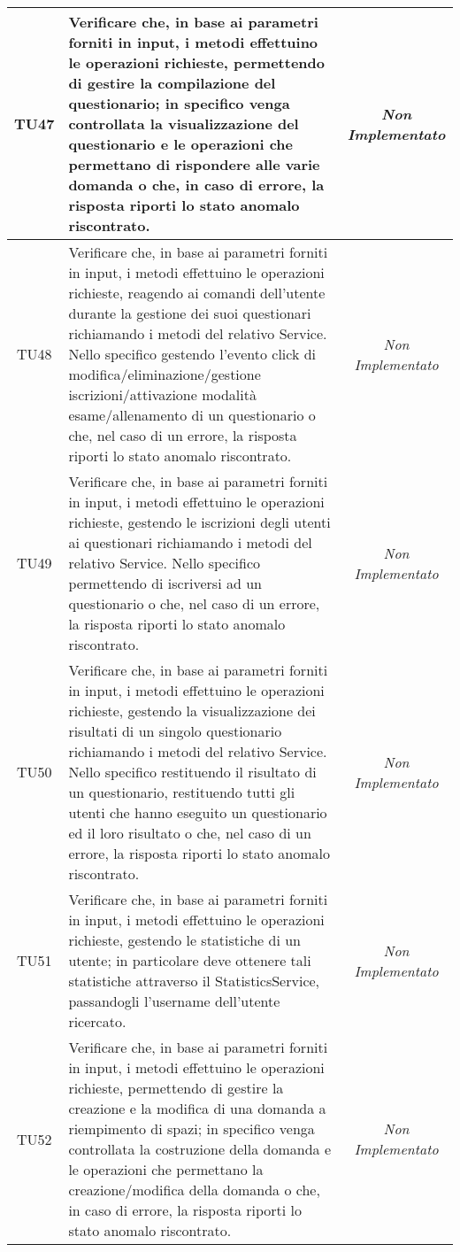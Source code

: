 \begin{longtable}{|c|>{}m{10cm}|c|}
\hypertarget{TU47}{TU47} & Verificare che, in base ai parametri forniti in input, i metodi effettuino le operazioni richieste, permettendo di gestire la compilazione del questionario; in specifico venga controllata la visualizzazione del questionario e le operazioni che permettano di rispondere alle varie domanda o che, in caso di errore, la risposta riporti lo stato anomalo riscontrato. & \textit{Non Implementato}\\ \hline
\hypertarget{TU48}{TU48} & Verificare che, in base ai parametri forniti in input, i metodi effettuino le operazioni richieste, reagendo ai comandi dell'utente durante la gestione dei suoi questionari richiamando i metodi del relativo Service. Nello specifico gestendo l'evento click di modifica/eliminazione/gestione iscrizioni/attivazione modalità esame/allenamento di un questionario o che, nel caso di un errore, la risposta riporti lo stato anomalo riscontrato. & \textit{Non Implementato}\\ \hline
\hypertarget{TU49}{TU49} & Verificare che, in base ai parametri forniti in input, i metodi effettuino le operazioni richieste, gestendo le iscrizioni degli utenti ai questionari richiamando i metodi del relativo Service. Nello specifico permettendo di iscriversi ad un questionario o che, nel caso di un errore, la risposta riporti lo stato anomalo riscontrato. & \textit{Non Implementato}\\ \hline
\hypertarget{TU50}{TU50} & Verificare che, in base ai parametri forniti in input, i metodi effettuino le operazioni richieste, gestendo la visualizzazione dei risultati di un singolo questionario richiamando i metodi del relativo Service. Nello specifico restituendo il risultato di un questionario, restituendo tutti gli utenti che hanno eseguito un questionario ed il loro risultato o che, nel caso di un errore, la risposta riporti lo stato anomalo riscontrato. & \textit{Non Implementato}\\ \hline
\hypertarget{TU51}{TU51} & Verificare che, in base ai parametri forniti in input, i metodi effettuino le operazioni richieste, gestendo le statistiche di un utente; in particolare deve ottenere tali statistiche attraverso il StatisticsService, passandogli l'username dell'utente ricercato. & \textit{Non Implementato}\\ \hline
\hypertarget{TU52}{TU52} & Verificare che, in base ai parametri forniti in input, i metodi effettuino le operazioni richieste, permettendo di gestire la creazione e la modifica di una domanda a riempimento di spazi; in specifico venga controllata la costruzione della domanda e le operazioni che permettano la creazione/modifica della domanda o che, in caso di errore, la risposta riporti lo stato anomalo riscontrato. & \textit{Non Implementato}\\ \hline

\end{longtable}
